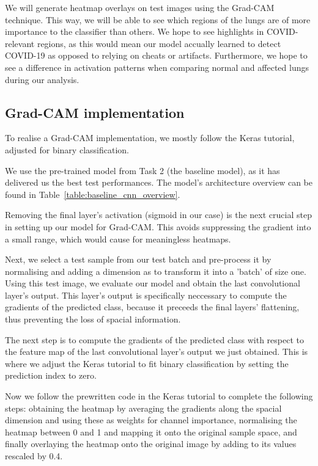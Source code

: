 \documentclass[conference]{IEEEtran}
\begin{document}
We will generate heatmap overlays on test images using the Grad-CAM technique. This way, we will be able to see which regions of the lungs are of more importance to the classifier than others. We hope to see highlights in COVID-relevant regions, as this would mean our model accually learned to detect COVID-19 as opposed to relying on cheats or artifacts. Furthermore, we hope to see a difference in activation patterns when comparing normal and affected lungs during our analysis.

\subsection{Grad-CAM implementation}
To realise a Grad-CAM implementation, we mostly follow the Keras tutorial, adjusted for binary classification.

\vspace{0.5cm} We use the pre-trained model from Task 2 (the baseline model), as it has delivered us the best test performances. The model's architecture overview can be found in Table~\ref{table:baseline_cnn_overview}. 

Removing the final layer's activation (sigmoid in our case) is the next crucial step in setting up our model for Grad-CAM\@. This avoids suppressing the gradient into a small range, which would cause for meaningless heatmaps.

Next, we select a test sample from our test batch and pre-process it by normalising and adding a dimension as to transform it into a 'batch' of size one. Using this test image, we evaluate our model and obtain the last convolutional layer's output. This layer's output is specifically neccessary to compute the gradients of the predicted class, because it preceeds the final layers' flattening, thus preventing the loss of spacial information.

The next step is to compute the gradients of the predicted class with respect to the feature map of the last convolutional layer's output we just obtained. This is where we adjust the Keras tutorial to fit binary classification by setting the prediction index to zero.

Now we follow the prewritten code in the Keras tutorial to complete the following steps: obtaining the heatmap by averaging the gradients along the spacial dimension and using these as weights for channel importance, normalising the heatmap between 0 and 1 and mapping it onto the original sample space, and finally overlaying the heatmap onto the original image by adding to its values rescaled by 0.4.
\end{document}
